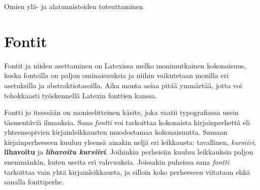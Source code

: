 \begin{esimerkki*}
\caption{Omien ylä- ja alatunnisteiden toteuttaminen}
\label{esim:fancyhdr_koko}
\end{esimerkki*}

\section{Fontit}
\label{luku:kirjaintyypit}

Fontit ja niiden asettaminen on Latexissa melko monimutkainen
kokonaisuus, koska fonteilla on paljon ominaisuuksia ja niihin
vaikutetaan monilla eri asetuksilla ja abstraktiotasoilla. Aika monta
asiaa pitää ymmärtää, jotta voi tehokkaasti työskennellä Latexin
fonttien kanssa.

Fontti jo itsessään on moniselitteinen käsite, joka vaatii typografiassa
usein täsmentäviä ilmauksia. Sana \emph{fontti} voi tarkoittaa
kokonaista kirjainperhettä eli yhteensopivien kirjainleikkausten
muodostamaa kokonaisuutta. Samaan kirjainperheeseen kuuluu yleensä
ainakin neljä eri leikkausta: tavallinen, \textit{kursiivi},
\textbf{lihavoitu} ja \textbf{\textit{lihavoitu kursiivi}}. Joihinkin
perheisiin kuuluu leikkauksia paljon enemmänkin, kuten useita eri
vahvuuksia. Joissakin puheissa sana \emph{fontti} tarkoittaa vain yhtä
kirjainleikkausta, ja silloin koko perheeseen viitataan ehkä sanalla
fonttiperhe.


